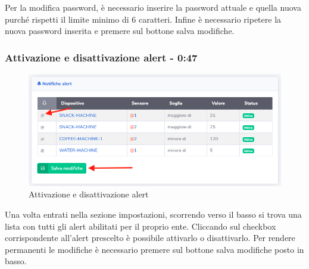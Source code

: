 		Per la modifica password, è necessario inserire la password attuale e quella nuova purché rispetti il limite minimo di 6 caratteri.
		Infine è necessario ripetere la nuova password inserita e premere sul bottone salva modifiche.

	\subsubsection{Attivazione e disattivazione alert - 0:47}

		\begin{figure}[H]
		\centering
		\includegraphics[scale=0.600]{res/images/membro/attDisattAlert.png}
		\caption{Attivazione e disattivazione alert}
	\end{figure}

		Una volta entrati nella sezione impostazioni, scorrendo verso il basso si trova una lista con tutti gli alert abilitati per il proprio ente. Cliccando sul checkbox corrispondente all'alert prescelto è possibile attivarlo o disattivarlo. Per rendere permanenti le modifiche è necessario premere sul bottone salva modifiche posto in basso.
	

